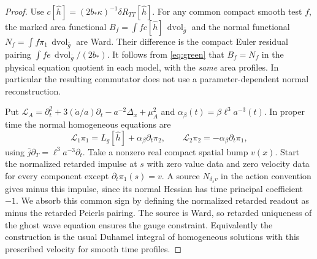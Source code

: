 \documentclass[11pt]{article}
\newcommand{\vol}{\operatorname{dvol}}
\begin{document}
\begin{proof}
Use $c[\widehat h]=(2b_*\kappa)^{-1}\delta R_{TT}[\widehat h]$. For any common compact smooth test $f$, the marked area functional $B_f=\int f c[\widehat h]\,\vol_{\bar g}$ and the normal functional $N_f=\int f\pi_1\,\vol_{\bar g}$ are Ward. Their difference is the compact Euler residual pairing $\int fe\,\vol_{\bar g}/(2b_*)$. It follows from \eqref{eq:green} that $B_f=N_f$ in the physical equation quotient in each model, with the \emph{same} area profiles. In particular the resulting commutator does not use a parameter-dependent normal reconstruction.

Put $\mathcal L_A=\partial_t^2+3(\dot a/a)\partial_t-a^{-2}\Delta_x+\mu_A^2$ and $\alpha_\beta(t)=\beta\ell^3 a^{-3}(t)$. In proper time the normal homogeneous equations are
\[
 \mathcal L_1\pi_1=L_g[\widehat h]+\alpha_\beta\partial_t\pi_2,
 \qquad \mathcal L_2\pi_2=-\alpha_\beta\partial_t\pi_1,
\]
using $\bar j\partial_T=\ell^3a^{-3}\partial_t$. Take a nonzero real compact spatial bump $v(x)$. Start the normalized retarded impulse at $s$ with zero value data and zero velocity data for every component except $\partial_t\pi_1(s)=v$. A source $N_{\delta_s v}$ in the action convention gives minus this impulse, since its normal Hessian has time principal coefficient $-1$. We absorb this common sign by defining the normalized retarded readout as minus the retarded Peierls pairing. The source is Ward, so retarded uniqueness of the ghost wave equation ensures the gauge constraint. Equivalently the construction is the usual Duhamel integral of homogeneous solutions with this prescribed velocity for smooth time profiles.


\end{proof}
\end{document}

